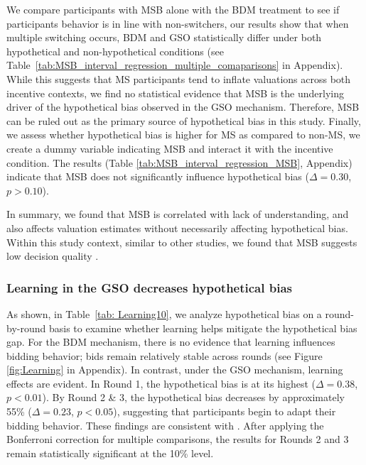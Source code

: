 \documentclass[12pt]{article}
\begin{document}
We compare participants with MSB alone with the BDM treatment to see if participants behavior is in line with non-switchers, our results show that when multiple switching occurs, BDM and GSO statistically differ under both hypothetical and non-hypothetical conditions (see Table~\ref{tab:MSB_interval_regression_multiple_comaparisons} in Appendix). While this suggests that MS participants tend to inflate valuations across both incentive contexts, we find no statistical evidence that MSB is the underlying driver of the hypothetical bias observed in the GSO mechanism. Therefore, MSB can be ruled out as the primary source of hypothetical bias in this study. Finally, we assess whether hypothetical bias is higher for MS as compared to non-MS, we create a dummy variable indicating MSB and interact it with the incentive condition. The results (Table \ref{tab:MSB_interval_regression_MSB}, Appendix) indicate that MSB does not significantly influence hypothetical bias (\(\Delta = 0.30\), \(p > 0.10\)). 

In summary, we found that MSB is correlated with lack of understanding, and also affects valuation estimates without necessarily affecting hypothetical bias. Within this study context, similar to other studies, we found that MSB suggests low decision quality \citep{charness2013experimental, yu2021multiple}.





\subsubsection{Learning in the GSO decreases hypothetical bias}

As shown, in Table~\ref{tab: Learning10}, we analyze hypothetical bias on a round-by-round basis to examine whether learning helps mitigate the hypothetical bias gap. For the BDM mechanism, there is no evidence that learning influences bidding behavior; bids remain relatively stable across rounds (see Figure \ref{fig:Learning} in Appendix).
In contrast, under the GSO mechanism, learning effects are evident. In Round 1, the hypothetical bias is at its highest (\(\Delta = 0.38\), \(p < 0.01\)). By Round 2 \& 3, the hypothetical bias decreases by approximately 55\% (\(\Delta = 0.23\), \(p < 0.05\)), suggesting that participants begin to adapt their bidding behavior. These findings are consistent with \citet{brown_is_2023}. After applying the Bonferroni correction for multiple comparisons, the results for Rounds 2 and 3 remain statistically significant at the 10\% level.
\end{document}
